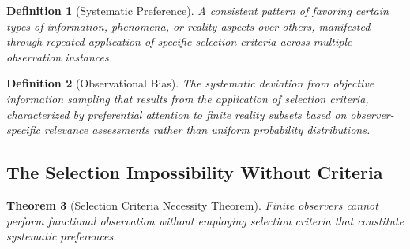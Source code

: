 \documentclass[12pt,a4paper]{article}
\newtheorem{theorem}{Theorem}[section]
\newtheorem{definition}[theorem]{Definition}
\begin{document}
\begin{definition}[Systematic Preference]
A consistent pattern of favoring certain types of information, phenomena, or reality aspects over others, manifested through repeated application of specific selection criteria across multiple observation instances.
\end{definition}

\begin{definition}[Observational Bias]
The systematic deviation from objective information sampling that results from the application of selection criteria, characterized by preferential attention to finite reality subsets based on observer-specific relevance assessments rather than uniform probability distributions.
\end{definition}

\subsection{The Selection Impossibility Without Criteria}

\begin{theorem}[Selection Criteria Necessity Theorem]
Finite observers cannot perform functional observation without employing selection criteria that constitute systematic preferences.
\end{theorem}
\end{document}
